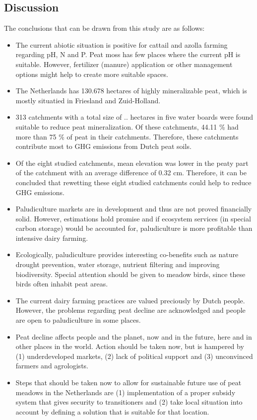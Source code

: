 {\begin{enumerate}
\chapter{Discussion} \label{ch:con}

The conclusions that can be drawn from this study are as follows:

\begin{itemize}
\item The current abiotic situation is positive for cattail and azolla farming regarding pH, N and P. Peat moss has few places where the current pH is suitable. However, fertilizer (manure) application or other management options might help to create more suitable spaces.
\item The Netherlands has 130.678 hectares of highly mineralizable peat, which is mostly situatied in Friesland and Zuid-Holland. 
\item 313 catchments with a total size of .. hectares in five water boards were found suitable to reduce peat mineralization. Of these catchments, 44.11 \% had more than 75 \% of peat in their catchments. Therefore, these catchments contribute most to GHG emissions from Dutch peat soils.
\item Of the eight studied catchments, mean elevation was lower in the peaty part of the catchment with an average difference of 0.32 cm. Therefore, it can be concluded that rewetting these eight studied catchments could help to reduce GHG emissions.
\item Paludiculture markets are in development and thus are not proved financially solid. However, estimations hold promise and if ecosystem services (in special carbon storage) would be accounted for, paludiculture is more profitable than intensive dairy farming.
\item Ecologically, paludiculture provides interesting co-benefits such as nature drought prevention, water storage, nutrient filtering and improving biodiversity. Special attention should be given to meadow birds, since these birds often inhabit peat areas.
\item The current dairy farming practices are valued preciously by Dutch people. However, the problems regarding peat decline are acknowledged and people are open to paludiculture in some places. 
\item Peat decline affects people and the planet, now and in the future, here and in other places in the world. Action should be taken now, but is hampered by (1) underdeveloped markets, (2) lack of political support and (3) unconvinced farmers and agrologists. 
\item Steps that should be taken now to allow for sustainable future use of peat meadows in the Netherlands are (1) implementation of a proper subsidy system that gives security to transitioners and (2) take local situation into account by defining a solution that is suitable for that location.
\end{itemize}


\end{enumerate}}
